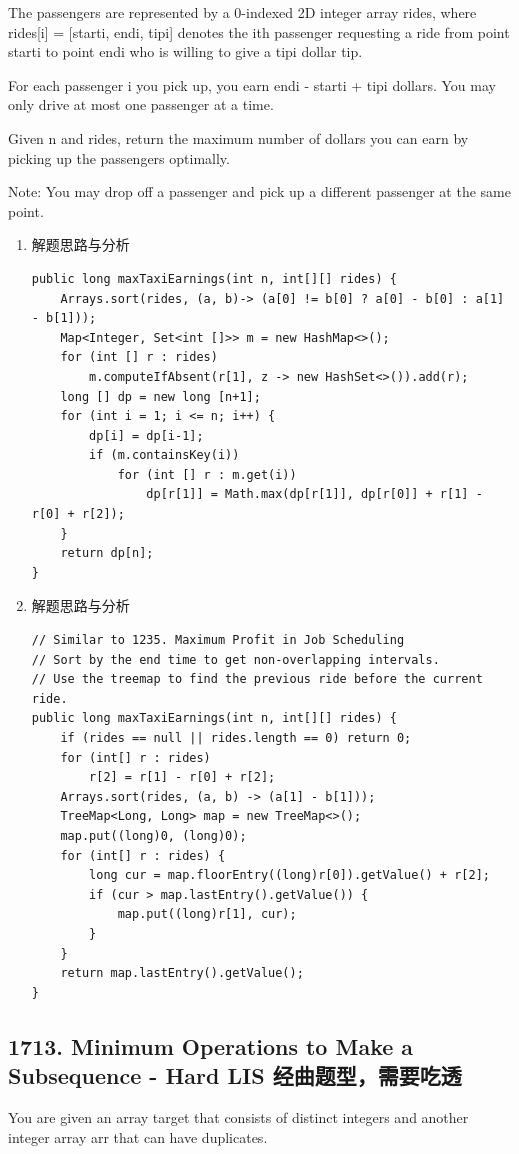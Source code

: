 \documentclass[9pt, b5paaper]{book}
\begin{document}
The passengers are represented by a 0-indexed 2D integer array rides, where rides[i] = [starti, endi, tipi] denotes the ith passenger requesting a ride from point starti to point endi who is willing to give a tipi dollar tip.

For each passenger i you pick up, you earn endi - starti + tipi dollars. You may only drive at most one passenger at a time.

Given n and rides, return the maximum number of dollars you can earn by picking up the passengers optimally.

Note: You may drop off a passenger and pick up a different passenger at the same point.
\begin{enumerate}
\item 解题思路与分析
\label{sec-1-4-4-1}
\begin{verbatim}
public long maxTaxiEarnings(int n, int[][] rides) {
    Arrays.sort(rides, (a, b)-> (a[0] != b[0] ? a[0] - b[0] : a[1] - b[1]));
    Map<Integer, Set<int []>> m = new HashMap<>();
    for (int [] r : rides) 
        m.computeIfAbsent(r[1], z -> new HashSet<>()).add(r);
    long [] dp = new long [n+1];
    for (int i = 1; i <= n; i++) {
        dp[i] = dp[i-1];
        if (m.containsKey(i)) 
            for (int [] r : m.get(i)) 
                dp[r[1]] = Math.max(dp[r[1]], dp[r[0]] + r[1] - r[0] + r[2]);
    }
    return dp[n];
}
\end{verbatim}
\item 解题思路与分析
\label{sec-1-4-4-2}
\begin{verbatim}
// Similar to 1235. Maximum Profit in Job Scheduling
// Sort by the end time to get non-overlapping intervals.
// Use the treemap to find the previous ride before the current ride.
public long maxTaxiEarnings(int n, int[][] rides) {
    if (rides == null || rides.length == 0) return 0;
    for (int[] r : rides) 
        r[2] = r[1] - r[0] + r[2];
    Arrays.sort(rides, (a, b) -> (a[1] - b[1]));
    TreeMap<Long, Long> map = new TreeMap<>();
    map.put((long)0, (long)0); 
    for (int[] r : rides) {
        long cur = map.floorEntry((long)r[0]).getValue() + r[2];
        if (cur > map.lastEntry().getValue()) {
            map.put((long)r[1], cur);
        }
    }
    return map.lastEntry().getValue();
}
\end{verbatim}
\end{enumerate}

\subsection{1713. Minimum Operations to Make a Subsequence - Hard LIS 经曲题型，需要吃透}
\label{sec-1-4-5}
You are given an array target that consists of distinct integers and another integer array arr that can have duplicates.
\end{document}
